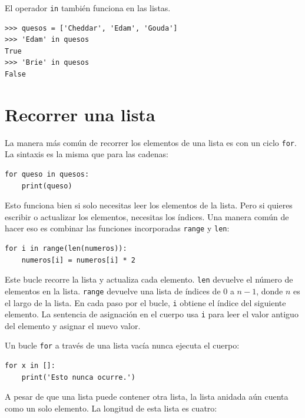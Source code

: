\documentclass[10pt]{book}
\begin{document}

El operador {\tt in} también funciona en las listas.

\begin{verbatim}
>>> quesos = ['Cheddar', 'Edam', 'Gouda']
>>> 'Edam' in quesos
True
>>> 'Brie' in quesos
False
\end{verbatim}


\section{Recorrer una lista}

La manera más común de recorrer los elementos de una lista es
con un ciclo {\tt for}.  La sintaxis es la misma que para las cadenas:

\begin{verbatim}
for queso in quesos:
    print(queso)
\end{verbatim}
%
Esto funciona bien si solo necesitas leer los elementos de la
lista.  Pero si quieres escribir o actualizar los elementos,
necesitas los índices.  Una manera común de hacer eso es combinar
las funciones incorporadas {\tt range} y {\tt len}:

\begin{verbatim}
for i in range(len(numeros)):
    numeros[i] = numeros[i] * 2
\end{verbatim}
%
Este bucle recorre la lista y actualiza cada elemento.  {\tt len}
devuelve el número de elementos en la lista.  {\tt range} devuelve
una lista de índices de 0 a $n-1$, donde $n$ es el largo de
la lista.  En cada paso por el bucle, {\tt i} obtiene el índice
del siguiente elemento.  La sentencia de asignación en el cuerpo usa
{\tt i} para leer el valor antiguo del elemento y asignar el
nuevo valor.

Un bucle {\tt for} a través de una lista vacía nunca ejecuta el cuerpo:

\begin{verbatim}
for x in []:
    print('Esto nunca ocurre.')
\end{verbatim}
%
A pesar de que una lista puede contener otra lista, la lista
anidada aún cuenta como un solo elemento.  La longitud de esta lista es
cuatro:
\end{document}

